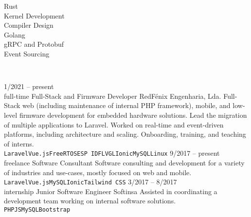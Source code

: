 \documentclass[9pt]{developercv} %
\begin{document}
\hfill
\begin{minipage}[t]{0.2\textwidth}
	\vspace{-\baselineskip} %
	

        Rust\\
        Kernel Development\\
        Compiler Design\\
        Golang\\
        gRPC and Protobuf\\
        Event Sourcing
\end{minipage}

\hfill\\



\begin{entrylist}
	\entry
		{1/2021 -- present\\\footnotesize{full-time}}
		{Full-Stack and Firmware Developer}
		{RedFénix Engenharia, Lda.}
		{Full-Stack web (including maintenance of internal PHP framework), mobile, and low-level firmware development for embedded hardware solutions. Lead the migration of multiple applications to Laravel. Worked on real-time and event-driven platforms, including architecture and scaling. Onboarding, training, and teaching of interns. \\ \texttt{Laravel}\slashsep\texttt{Vue.js}\slashsep\texttt{FreeRTOS}\slashsep\texttt{ESP IDF}\slashsep\texttt{LVGL}\slashsep\texttt{Ionic}\slashsep\texttt{MySQL}\slashsep\texttt{Linux}}
	\entry
		{9/2017 -- present\\\footnotesize{freelance}}
		{Software Consultant}
		{}
		{Software consulting and development for a variety of industries and use-cases, mostly focused on web and mobile.\\ \texttt{Laravel}\slashsep\texttt{Vue.js}\slashsep\texttt{MySQL}\slashsep\texttt{Ionic}\slashsep\texttt{Tailwind CSS}}
        \entry
		{3/2017 -- 8/2017\\\footnotesize{internship}}
		{Junior Software Engineer}
		{Softinsa}
		{Assisted in coordinating a development team working on internal software solutions.\\ \texttt{PHP}\slashsep\texttt{JS}\slashsep\texttt{MySQL}\slashsep\texttt{Bootstrap}}
\end{entrylist}
\end{document}
